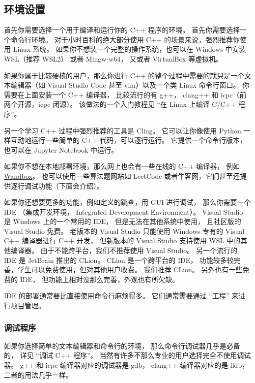 
\subsection{环境设置}
首先你需要选择一个用于编译和运行你的 C++ 程序的环境。 首先你需要选择一个命令行环境。 对于小时百科的绝大部分使用 C++ 的场景来说，强烈推荐你使用 Linux 系统。 如果你不想装一个完整的操作系统，也可以在 Windows 中安装 WSL（推荐 WSL2） 或者 Mingw-w64， 又或者 VirtualBox 等虚拟机。

如果你属于比较硬核的用户，那么你进行 C++ 的整个过程中需要的就只是一个文本编辑器（如 Visual Studio Code 甚至 vim）以及一个类 Linux 命令行窗口。 你需要在上面安装一个 C++ 编译器， 比较流行的有 g++， clang++ 和 icpc（前两个开源，icpc 闭源）。 该做法的一个入门教程见 “在 Linux 上编译 C/C++ 程序”。

另一个学习 C++ 过程中强烈推荐的工具是 Cling。 它可以让你像使用 Python 一样互动地运行一些简单的 C++ 代码，可以逐行运行。 它提供一个命令行版本，也可以在 Jupyter Notebook 中运行。

如果你不想在本地部署环境，那么网上也会有一些在线的 C++ 编译器， 例如 \href{https://wandbox.org/}{Wandbox}。 也可以使用一些算法题网站如 LeetCode 或者牛客网，它们甚至还提供逐行调试功能（下面会介绍）。

如果你还想要更多的功能，例如定义的跳查，用 GUI 进行调试， 那么你需要一个 IDE （集成开发环境， Integrated Development Environment）。 Visual Studio 是 Windows 上的一个常用的 IDE， 但是无法在其他系统中使用， 且社区版的 Visual Studio 免费。 老版本的 Visual Studio 只能使用 Windows 专有的 Visual C++ 编译器进行 C++ 开发， 但新版本的 Visual Studio 支持使用 WSL 中的其他编译器。 由于不能跨平台，我们不推荐使用 Visual Studio。 另一个流行的 IDE 是 JetBrain 推出的 CLion。 CLion 是一个跨平台的 IDE， 功能较多较完善，学生可以免费使用，但对其他用户收费。 我们推荐 CLion。 另外也有一些免费的 IDE， 但功能上相对没那么完善，外观也有所欠缺。

IDE 的部署通常要比直接使用命令行麻烦得多。 它们通常需要通过 “工程” 来进行项目管理。

\subsubsection{调试程序}
如果你选择简单的文本编辑器和命令行的环境， 那么命令行调试器几乎是必备的， 详见 “调试 C++ 程序”。 当然有许多不那么专业的用户选择完全不使用调试器。 g++ 和 icpc 编译器对应的调试器是 gdb， clang++ 编译器对应的是 lldb， 二者的用法几乎一样。

\subsection{}